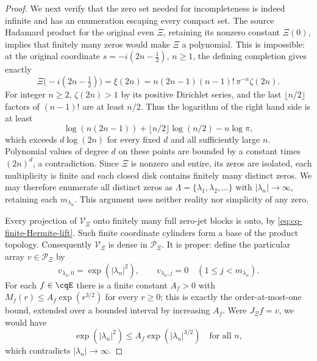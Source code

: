 \begin{proof}
We next verify that the zero set needed for incompleteness is
indeed infinite and has an enumeration escaping every compact
set. The source Hadamard product for the original even $\Xi$,
retaining its nonzero constant $\Xi(0)$, implies that finitely
many zeros would make $\Xi$ a polynomial. This is impossible:
at the original coordinate $s=-i(2n-\tfrac12)$, $n\geq1$,
the defining completion gives exactly
\begin{equation}\label{eq:cq-Xi-nonpolynomial-values}
 \Xi\bigl(-i(2n-\tfrac12)\bigr)
 =\xi(2n)=n(2n-1)(n-1)!\,\pi^{-n}\zeta(2n).
\end{equation}
For integer $n\geq2$, $\zeta(2n)>1$ by its positive Dirichlet
series, and the last $\lfloor n/2\rfloor$ factors of $(n-1)!$
are at least $n/2$. Thus the logarithm of the right hand side is
at least
\[
 \log(n(2n-1))+\lfloor n/2\rfloor\log(n/2)-n\log\pi,
\]
which exceeds $d\log(2n)$ for every fixed $d$ and all
sufficiently large $n$. Polynomial values of degree $d$ on these
points are bounded by a constant times $(2n)^d$, a contradiction.
Since $\Xi$ is nonzero and entire, its zeros are isolated, each
multiplicity is finite and each closed disk contains finitely
many distinct zeros. We may therefore enumerate all distinct
zeros as $\Lambda=\{\lambda_1,\lambda_2,\ldots\}$ with
$|\lambda_n|\to\infty$, retaining each $m_{\lambda_n}$.
This argument uses neither reality nor simplicity of any zero.

Every projection of $\mathcal V_\Xi$ onto finitely many full
zero-jet blocks is onto, by \eqref{eq:cq-finite-Hermite-lift}.
Such finite coordinate cylinders form a base of the product
topology. Consequently $\mathcal V_\Xi$ is dense in
$\mathcal P_\Xi$. It is proper: define the particular array
$v\in\mathcal P_\Xi$ by
\begin{equation}\label{eq:cq-nonrealizable-jet-array}
 v_{\lambda_n,0}=\exp(|\lambda_n|^2),\qquad
 v_{\lambda_n,j}=0\quad(1\leq j<m_{\lambda_n}).
\end{equation}
For each $f\in\cqE$ there is a finite constant $A_f>0$ with
$M_f(r)\leq A_f\exp(r^{3/2})$ for every $r\geq0$; this is
exactly the order-at-most-one bound, extended over a bounded
interval by increasing $A_f$. Were $J_\Xi f=v$, we would have
\[
 \exp(|\lambda_n|^2)
 \leq A_f\exp(|\lambda_n|^{3/2})\quad\text{for all }n,
\]
which contradicts $|\lambda_n|\to\infty$.


\end{proof}
